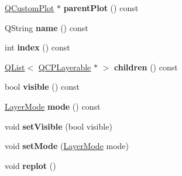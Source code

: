 \begin{DoxyCompactItemize}
\item 
\mbox{\label{class_q_c_p_layer_a5520019787482e13857ebe631c27c3fa}} 
\hyperlink{class_q_custom_plot}{Q\+Custom\+Plot} $\ast$ {\bfseries parent\+Plot} () const
\item 
\mbox{\label{class_q_c_p_layer_a37806f662b50b588fb1029a14fc5ef50}} 
Q\+String {\bfseries name} () const
\item 
\mbox{\label{class_q_c_p_layer_ad322905c4700dcc7ceba63e011c730d2}} 
int {\bfseries index} () const
\item 
\mbox{\label{class_q_c_p_layer_a0fc3d877306a3bccfdb5708c83fbcece}} 
\hyperlink{class_q_list}{Q\+List}$<$ \hyperlink{class_q_c_p_layerable}{Q\+C\+P\+Layerable} $\ast$ $>$ {\bfseries children} () const
\item 
\mbox{\label{class_q_c_p_layer_ad1cc2d6b32d2abb33c7f449b964e068c}} 
bool {\bfseries visible} () const
\item 
\mbox{\label{class_q_c_p_layer_a44ae50b011b19f3dd46a38d8e2e2c1b6}} 
\hyperlink{class_q_c_p_layer_a67dcfc1590be2a1f2227c5a39bb59c7c}{Layer\+Mode} {\bfseries mode} () const
\item 
\mbox{\label{class_q_c_p_layer_ac07671f74edf6884b51a82afb2c19516}} 
void {\bfseries set\+Visible} (bool visible)
\item 
\mbox{\label{class_q_c_p_layer_a938d57b04f4e4c23cedf1711f983919b}} 
void {\bfseries set\+Mode} (\hyperlink{class_q_c_p_layer_a67dcfc1590be2a1f2227c5a39bb59c7c}{Layer\+Mode} mode)
\item 
\mbox{\label{class_q_c_p_layer_adefd53b6db02f470151c416f42e37180}} 
void {\bfseries replot} ()
\end{DoxyCompactItemize}
